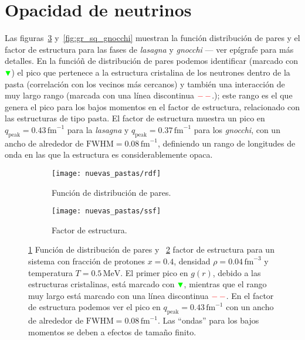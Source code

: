 \section{Opacidad de neutrinos}\label{sc:opacity}

Las figuras~\ref{fig:gr_sq} y~\ref{fig:gr_sq_gnocchi} muestran la función distribución de pares y el factor de estructura  para las fases de \emph{lasagna} y \emph{gnocchi} --- ver epígrafe para más detalles.
En la funcióñ de distribución de pares podemos identificar (marcado con $\color{green} \blacktriangledown$) el pico que pertenece a la estructura cristalina de los neutrones dentro de la pasta (correlación con los vecinos más cercanos) y también una interacción de muy largo rango (marcada con una línea discontinua $\color{red}-\,-$.);
este rango es el que genera el pico para los bajos momentos en el factor de estructura, relacionado con las estructuras de tipo pasta.
El factor de estructura muestra un pico en $q_\text{peak} = 0.43\,\text{fm}^{-1}$ para la \emph{lasagna} y $q_\text{peak} = 0.37\,\text{fm}^{-1}$ para los \emph{gnocchi}, con un ancho de alrededor de
$\text{FWHM} = 0.08\,\text{fm}^{-1}$, definiendo un rango de longitudes de onda en las que la estructura es considerablemente opaca.

\begin{figure}  \centering
  \begin{subfigure}[h!]{0.4\columnwidth}
    \centering
    \texttt{[image: nuevas\_pastas/rdf]}
    \caption{Función de distribución de pares.}
      \label{sfig:gr}
  \end{subfigure}
  \begin{subfigure}[h!]{0.4\columnwidth}
    \centering
    \texttt{[image: nuevas\_pastas/ssf]}
    \caption{Factor de estructura.}
      \label{sfig:ssf}
  \end{subfigure}
  \caption{\ref{sfig:gr} Función de distribución de pares y ~\ref{sfig:ssf} factor de estructura para un sistema con fracción de protones $x=0.4$, densidad $\rho=0.04\,\text{fm}^{-3}$ y temperatura $T=0.5\,\text{MeV}$.
    El primer pico en $g(r)$, debido a las estructuras cristalinas, está marcado con $\color{green} \blacktriangledown$, mientras que el rango muy largo está marcado con una línea discontinua $\color{red}-\,-$.
    En el factor de estructura podemos ver el pico en $q_\text{peak} = 0.43\,\text{fm}^{-1}$ con un ancho de alrededor de $\text{FWHM} = 0.08\,\text{fm}^{-1}$.
    Las ``ondas'' para los bajos momentos se deben a efectos de tamaño finito.}
  \label{fig:gr_sq}
\end{figure}

